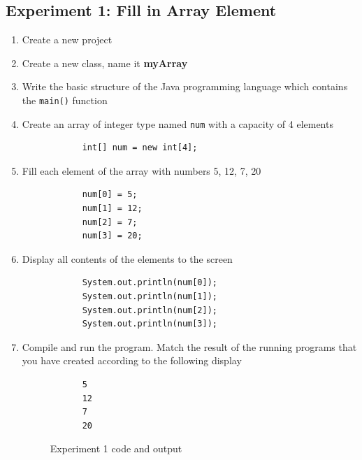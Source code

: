 \documentclass[12pt,titlepage]{article}
\begin{document}
\subsection{Experiment 1: Fill in Array Element}
\begin{enumerate}
    \item Create a new project
    \item Create a new class, name it \textbf{myArray}
    \item Write the basic structure of the Java programming language which contains the \texttt{main()} function
    \item {
        Create an array of integer type named \texttt{num} with a capacity of 4 elements

        \begin{verbatim}
            int[] num = new int[4];
        \end{verbatim}
    }
    \item {
        Fill each element of the array with numbers 5, 12, 7, 20

        \begin{verbatim}
            num[0] = 5;
            num[1] = 12;
            num[2] = 7;
            num[3] = 20;
        \end{verbatim}
    }
    \item {
        Display all contents of the elements to the screen

        \begin{verbatim}
            System.out.println(num[0]);
            System.out.println(num[1]);
            System.out.println(num[2]);
            System.out.println(num[3]);
        \end{verbatim}
    }
    \pagebreak
    \item {
        Compile and run the program. Match the result of the running programs that you have created according to the following display

        \begin{verbatim}
            5
            12
            7
            20
        \end{verbatim}

        \begin{figure}[h]
            \centering
            \caption{Experiment 1 code and output}
        \end{figure}
    }
\end{enumerate}
\end{document}
